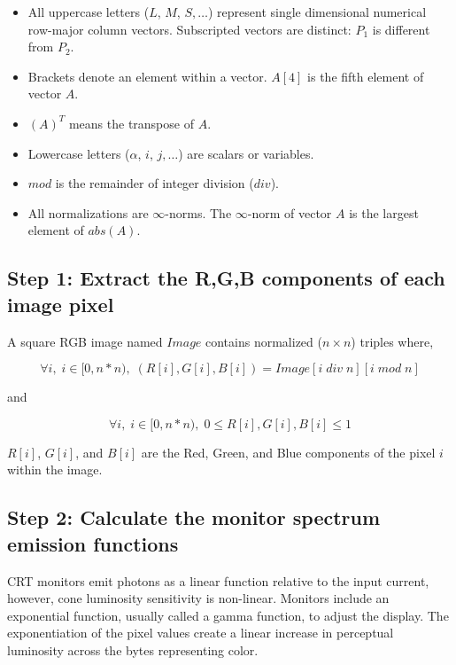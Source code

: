 \documentclass[12pt]{article}
\begin{document}
  \begin{itemize}
    \item All uppercase letters ($L$, $M$, $S, \ldots$) represent single
	dimensional numerical row-major column vectors.  
	Subscripted vectors are	distinct: $P_1$ is different from $P_2$.
    \item Brackets denote an element within a vector.  $A[4]$ is the 
	fifth element of vector $A$.
    \item $(A)^T$ means the transpose of $A$.
    \item Lowercase letters ($\alpha$, $i$, $j, \ldots$) are scalars
	or variables.
    \item $mod$ is the remainder of integer division ($div$).
    \item All normalizations are $\infty$-norms.  The $\infty$-norm 
	of vector $A$ is the largest element of $abs(A)$.
 	
  \end{itemize}

\subsection{Step 1: Extract the R,G,B components of each image pixel}

A square RGB image named $Image$ contains normalized ($n
\times n$) triples where,

\begin{equation}
\forall i,\; i \in [0,n * n),\; 
	(R[i],G[i],B[i]) = Image[i \; div \; n][i \; mod \; n]
\end{equation}

and 

\begin{equation}
\forall i,\; i \in [0,n*n),\; 0 \leq R[i],G[i],B[i] \leq 1
\end{equation}

$R[i]$, $G[i]$, and $B[i]$ are the Red, Green, and Blue components of
the pixel $i$ within the image.

\subsection{Step 2: Calculate the monitor spectrum emission functions}

CRT monitors emit photons as a linear function relative to the input
current, however, cone luminosity sensitivity is non-linear.  Monitors
include an exponential function, usually called a gamma function, to
adjust the display.  The exponentiation of the pixel values create a
linear increase in perceptual luminosity across the bytes representing
color.
\end{document}
